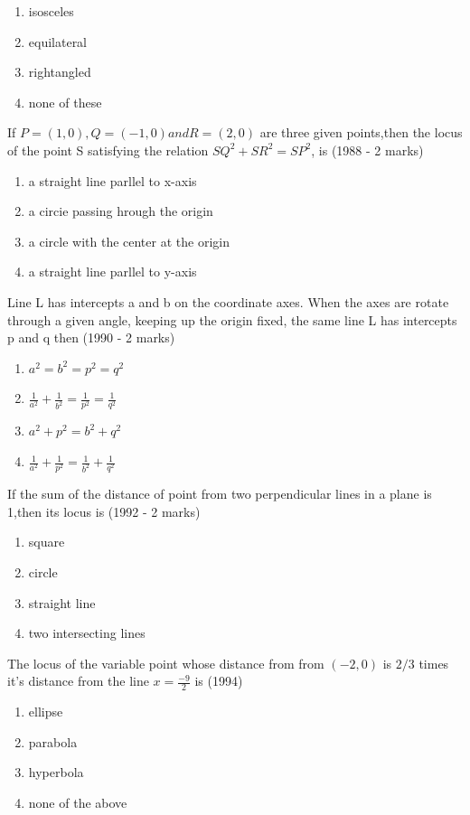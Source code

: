 \documentclass[12pt]{article}
\begin{document}
\begin{enumerate}
\item isosceles
\item equilateral
\item rightangled
\item none of these
\end{enumerate}
\item If $P=(1,0),Q=(-1,0) and R=(2,0)$ are three given points,then the locus of the point S satisfying the relation $SQ^2+SR^2=SP^2$, is (1988 - 2 marks)
\begin{enumerate}
\item a straight line parllel to x-axis  
\item a circie passing hrough the origin 
\item a circle with the center at the origin 
\item a straight line parllel to y-axis
\end{enumerate}
\item Line L has intercepts a and b on the coordinate axes. When the axes are rotate through a given angle, keeping up the origin fixed, the same line L has intercepts  p and q then (1990 - 2 marks)\\
\begin{enumerate}
\item $a^2=b^2=p^2=q^2$ 
\item $\frac{1}{a^2} +\frac{1}{b^2}=\frac{1}{p^2}=\frac{1}{q^2}$ 
\item $a^2+p^2=b^2+q^2$ 
\item $\frac{1}{a^2}+\frac{1}{p^2}=\frac{1}{b^2}+\frac{1}{q^2}$
\end{enumerate}
\item If the sum of the distance of point from two perpendicular lines in a plane is 1,then its locus is (1992 - 2 marks)\\
\begin{enumerate}
\item square 
\item circle 
\item straight line  
\item two intersecting lines
\end{enumerate}
\item The locus of the variable point whose distance from from $(-2,0)$ is $2/3$ times it's distance from the line $x= \frac{-9}{2}$ is (1994)
\begin{enumerate}
\item ellipse 
\item parabola  
\item hyperbola  
\item none of the above
\end{enumerate}
\end{document}
